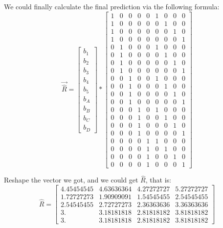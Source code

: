 \documentclass[12pt,a4paper]{article}
\begin{document}
We could finally calculate the final prediction via the following formula:
\begin{equation}
\vec{\hat{R}}=
\begin{bmatrix}
b_1\\
b_2\\
b_3\\
b_4\\
b_5\\
b_A\\
b_B\\
b_C\\
b_D
\end{bmatrix}
*
\begin{bmatrix}
1&  0&  0&  0&  0&  1&  0&  0&  0\\
1&  0&  0&  0&  0&  0&  1&  0&  0\\
1&  0&  0&  0&  0&  0&  0&  1&  0\\
1&  0&  0&  0&  0&  0&  0&  0&  1\\
0&  1&  0&  0&  0&  1&  0&  0&  0\\
0&  1&  0&  0&  0&  0&  1&  0&  0\\
0&  1&  0&  0&  0&  0&  0&  1&  0\\
0&  1&  0&  0&  0&  0&  0&  0&  1\\
0&  0&  1&  0&  0&  1&  0&  0&  0\\
0&  0&  1&  0&  0&  0&  1&  0&  0\\
0&  0&  1&  0&  0&  0&  0&  1&  0\\
0&  0&  1&  0&  0&  0&  0&  0&  1\\
0&  0&  0&  1&  0&  1&  0&  0&  0\\
0&  0&  0&  1&  0&  0&  1&  0&  0\\
0&  0&  0&  1&  0&  0&  0&  1&  0\\
0&  0&  0&  1&  0&  0&  0&  0&  1\\
0&  0&  0&  0&  1&  1&  0&  0&  0\\
0&  0&  0&  0&  1&  0&  1&  0&  0\\
0&  0&  0&  0&  1&  0&  0&  1&  0\\
0&  0&  0&  0&  1&  0&  0&  0&  1
\end{bmatrix}
\end{equation}


Reshape the vector we got, and we could get $\hat{R}$, that is:
\begin{equation}
\hat{R}=
\begin{bmatrix}
4.45454545 &  4.63636364 &  4.27272727 &  5.27272727 \\
1.72727273 &  1.90909091 &  1.54545455 &  2.54545455 \\
2.54545455 &  2.72727273 &  2.36363636 &  3.36363636 \\
3.        &  3.18181818 &  2.81818182 &  3.81818182 \\
3.        &  3.18181818 &  2.81818182 &  3.81818182
\end{bmatrix}
\end{equation}
\end{document}
